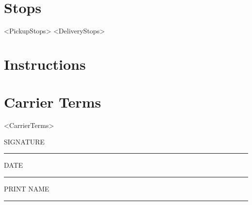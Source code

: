 \documentclass[11pt]{article}
\begin{document}
\section*{Stops}
\begin{itemize}[leftmargin=*,label={}]
    <PickupStops>
    <DeliveryStops>
\end{itemize}

\ifx\Instructions\empty
\else
\section*{Instructions}
\Instructions
\fi

\section*{Carrier Terms}
<CarrierTerms>

\vspace{0.5cm}

\begin{center}
SIGNATURE \rule{2in}{0.4pt} \hfill DATE \rule{1in}{0.4pt}
\end{center}
\begin{center}
PRINT NAME \rule{2in}{0.4pt}
\end{center}
\end{document}
